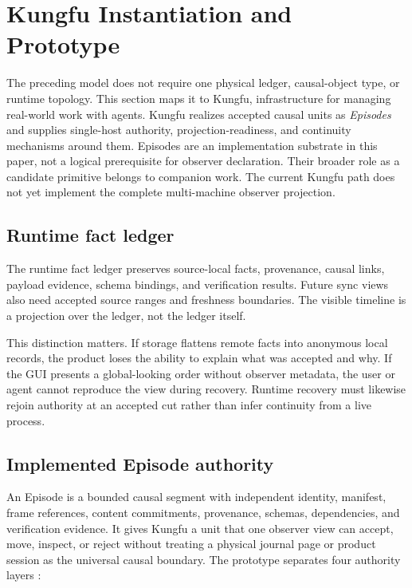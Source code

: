 \section{Kungfu Instantiation and Prototype}
\label{sec:design}

The preceding model does not require one physical ledger, causal-object type,
or runtime topology. This section maps it to Kungfu, infrastructure for managing
real-world work with agents. Kungfu realizes accepted causal units as
\emph{Episodes} and supplies single-host authority, projection-readiness, and
continuity mechanisms around them. Episodes are an implementation substrate in
this paper, not a logical prerequisite for observer declaration. Their broader
role as a candidate primitive belongs to companion work. The current Kungfu
path does not yet implement the complete multi-machine observer projection.

\subsection{Runtime fact ledger}

The runtime fact ledger preserves source-local facts, provenance, causal links,
payload evidence, schema bindings, and verification results. Future sync views
also need accepted source ranges and freshness boundaries. The visible timeline
is a projection over the ledger, not the ledger itself.

This distinction matters. If storage flattens remote facts into anonymous local
records, the product loses the ability to explain what was accepted and why. If
the GUI presents a global-looking order without observer metadata, the user or
agent cannot reproduce the view during recovery. Runtime recovery must likewise
rejoin authority at an accepted cut rather than infer continuity from a live
process.

\subsection{Implemented Episode authority}

An Episode is a bounded causal segment with independent identity, manifest,
frame references, content commitments, provenance, schemas, dependencies, and
verification evidence. It gives Kungfu a unit that one observer view can
accept, move, inspect, or reject without treating a physical journal page or
product session as the universal causal boundary. The prototype separates four
authority layers
\cite{kungfu2026episode}:

